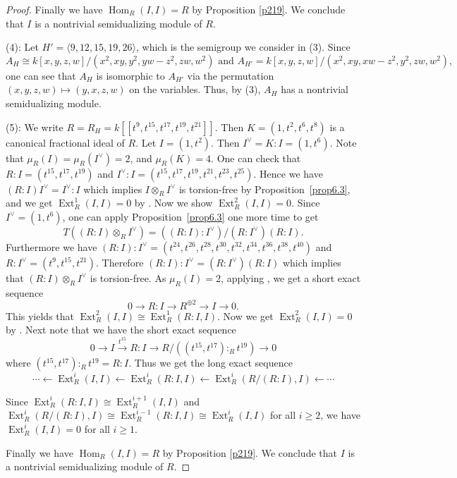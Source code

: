 \documentclass{amsart}
\DeclareMathOperator{\Hom}{Hom}
\DeclareMathOperator{\Ext}{Ext}
\theoremstyle{plain}
\theoremstyle{definition}
\numberwithin{theorem}{section}
\numberwithin{equation}{section}
\numberwithin{equation}{theorem}
\begin{document}
\begin{proof}
Finally we have $\Hom_R(I, I)=R$ by Proposition \ref{p219}.
We conclude that $I$ is a nontrivial semidualizing module of $R$.

(4): 
Let $H'=\langle9,12,15,19,26\rangle$, which is the semigroup we consider in (3).
Since 
\[
A_H \cong k[x,y,z,w]/(x^2,xy,y^2,yw-z^2,zw,w^2) \text{ and } A_{H'}=k[x,y,z,w]/(x^2,xy,xw-z^2,y^2,zw,w^2),
\]
one can see that $A_H$ is isomorphic to $A_{H'}$ via the permutation $(x,y,z,w) \mapsto (y,x,z,w)$ on the variables.
Thus, by (3), $A_H$ has a nontrivial semidualizing module.

(5): We write $R=R_H=k[\![t^9,t^{15},t^{17},t^{19},t^{21}]\!]$.
Then $K=(1, t^2, t^6, t^8)$ is a canonical fractional ideal of $R$.
Let $I=(1,t^2)$.
Then $I^{\vee}=K: I=(1, t^6)$.
Note that $\mu_R(I)=\mu_R(I^{\vee})=2$, and $\mu_R(K)=4$.
One can check that $R:I=(t^{15}, t^{17}, t^{19})$ and $I^{\vee}:I=(t^{15}, t^{17}, t^{19}, t^{21},t^{23},t^{25})$. Hence we have $(R:I)I^{\vee}=I^{\vee}:I$ which implies $I\otimes_R I^{\vee}$ is torsion-free by Proposition~\ref{prop6.3}, and we get $\Ext_R^1(I, I)=0$ by \cite[Lemma 4.6]{HW}.
Now we show $\Ext^2_R(I, I)=0$.
Since $I^{\vee}=(1, t^6)$, one can apply Proposition~\ref{prop6.3} one more time to get $$T((R:I)\otimes_R I^{\vee})=((R:I):I^{\vee})/(R:I^{\vee})(R:I).$$
Furthermore we have $(R:I):I^{\vee}=(t^{24}, t^{26}, t^{28}, t^{30}, t^{32}, t^{34}, t^{36}, t^{38}, t^{40})$ and $R:I^{\vee}=(t^{9}, t^{15}, t^{21})$. Therefore $(R:I):I^{\vee}=(R:I^{\vee})(R:I)$ which implies that $(R:I)\otimes_R I^{\vee}$ is torsion-free.
As $\mu_R(I)=2$, applying \cite[Lemma 3.3]{HH}, we get a short exact sequence
\[
0 \to R:I \to R^{\oplus 2} \to I \to 0.
\]
This yields that $\Ext^2_R(I, I) \cong \Ext^1_R(R:I, I)$.
Now we get $\Ext^2_R(I, I)=0$ by \cite[Lemma 4.6]{HW}.
Next note that we have the short exact sequence 
\begin{equation}
0\xrightarrow{} I \xrightarrow{t^{15}} R:I \xrightarrow{} R/ ((t^{15}, t^{17}):_R t^{19}) \xrightarrow{} 0 
\end{equation}
where $(t^{15}, t^{17}):_R t^{19}=R:I$.
Thus we get the long exact sequence 
\begin{equation}\cdots \xleftarrow{} \Ext_R^i(I, I)\xleftarrow{} \Ext_R^i(R:I, I) \xleftarrow{} \Ext^i_R(R/(R:I), I) \xleftarrow{} \cdots 
\end{equation}

Since $\Ext_R^i(R:I, I) \cong \Ext_R^{i+1} (I,I)$ and $\Ext^i_R(R/(R:I), I) \cong \Ext^{i-1}_R(R:I, I) \cong \Ext^i_R(I, I)$ for all $i\geq 2$, we have $\Ext^i_R (I, I) = 0$ for all $i\ge 1$.

Finally we have $\Hom_R(I,I)=R$ by Proposition \ref{p219}.
We conclude that $I$ is a nontrivial semidualizing module of $R$.
\end{proof}
\end{document}
